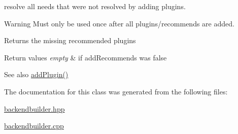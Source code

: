 resolve all needs that were not resolved by adding plugins. 

\begin{DoxyWarning}{Warning}
Must only be used once after all plugins/recommends are added.
\end{DoxyWarning}
\begin{DoxyReturn}{Returns}
the missing recommended plugins 
\end{DoxyReturn}

\begin{DoxyRetVals}{Return values}
{\em empty} & if add\+Recommends was false\\
\hline
\end{DoxyRetVals}
\begin{DoxySeeAlso}{See also}
\hyperlink{classkdb_1_1tools_1_1BackendBuilder_a987d2c3711399e24b42c38e652c0e1c4}{add\+Plugin()} 
\end{DoxySeeAlso}


The documentation for this class was generated from the following files\+:\begin{DoxyCompactItemize}
\item 
\hyperlink{backendbuilder_8hpp}{backendbuilder.\+hpp}\item 
\hyperlink{backendbuilder_8cpp}{backendbuilder.\+cpp}\end{DoxyCompactItemize}
